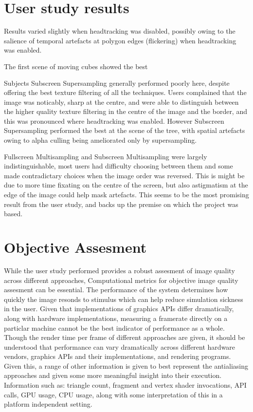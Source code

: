 \documentclass[12pt,a4paper,twoside,openright]{report}
\begin{document}
\section{User study results}

Results varied slightly when headtracking was disabled, possibly owing to the salience of temporal artefacts at polygon edges (flickering) when headtracking was enabled. 

The first scene of moving cubes showed the best 

Subjects Subscreen Supersampling generally performed poorly here, despite offering the best texture filtering of all the techniques. Users complained that the image was noticably, sharp at the centre, and were able to distinguish between the higher quality texture filtering in the centre of the image and the border, and this was pronounced where headtracking was enabled. However Subscreen Supersampling performed the best at the scene of the tree, with spatial artefacts owing to alpha culling being ameliorated only by supersampling.

Fullscreen Multisampling and Subscreen Multisampling were largely indistinguishable, most users had difficulty choosing between them and some made contradictary choices when the image order was reversed. This is might be due to more time fixating on the centre of the screen, but also astigmatism at the edge of the image could help mask artefacts. This seems to be the most promising result from the user study, and backs up the premise on which the project was based.

\section{Objective Assesment}

While the user study performed provides a robust assesment of image quality across different approaches, Computational metrics for objective image quality assesment can be essential. The performance of the system determines how quickly the image resonds to stimulus which can help reduce simulation sickness in the user. Given that implementations of graphics APIs differ dramatically, along with hardware implementations, measuring a framerate directly on a particlar machine cannot be the best indicator of performance as a whole. Though the render time per frame of different approaches are given, it should be understood that performance can vary dramatically across different hardware vendors, graphics APIs and their implementations, and rendering programs. Given this, a range of other information is given to best represent the antialiasing approaches and given some more meaningful insight into their execution. Information such as: triangle count, fragment and vertex shader invocations, API calls, GPU usage, CPU usage, along with some interpretation of this in a platform independent setting.
\end{document}
